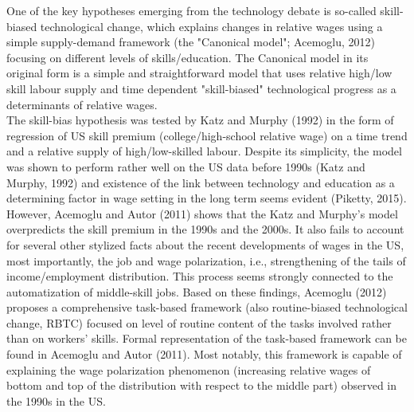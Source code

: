 \documentclass{article}
\begin{document}
One of the key hypotheses emerging from the technology debate is so-called skill-biased technological change, which explains changes in relative wages using a simple supply-demand framework (the "Canonical model"; Acemoglu, 2012) focusing on different levels of skills/education. The Canonical model in its original form is a simple and straightforward model that uses relative high/low skill labour supply and time dependent "skill-biased" technological progress as a determinants of relative wages.\\
The skill-bias hypothesis was tested by Katz and Murphy (1992) in the form of regression of US skill premium (college/high-school relative wage) on a time trend and a relative supply of high/low-skilled labour. Despite its simplicity, the model was shown to perform rather well on the US data before 1990s (Katz and Murphy, 1992) and existence of the link between technology and education as a determining factor in wage setting in the long term seems evident (Piketty, 2015). However, Acemoglu and Autor (2011) shows that the Katz and Murphy's model overpredicts the skill premium in the 1990s and the 2000s. It also fails to account for several other stylized facts about the recent developments of wages in the US, most importantly, the job and wage polarization, i.e., strengthening of the tails of income/employment distribution. This process seems strongly connected to the automatization of middle-skill jobs. Based on these findings, Acemoglu (2012) proposes a comprehensive task-based framework (also routine-biased technological change, RBTC) focused on level of routine content of the tasks involved rather than on workers' skills. Formal representation of the task-based framework can be found in Acemoglu and Autor (2011). Most notably, this framework is capable of explaining the wage polarization phenomenon (increasing relative wages of bottom and top of the distribution with respect to the middle part) observed in the 1990s in the US.\\
\end{document}
